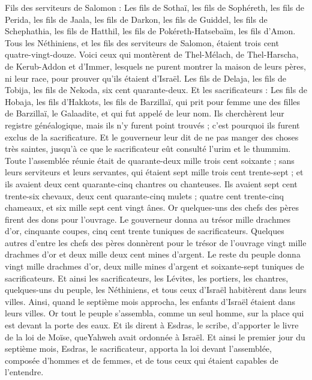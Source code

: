 \begin{multicols}{2}
Fils des serviteurs de Salomon : Les fils de Sothaï, les fils de Sophéreth, les fils de Perida,
les fils de Jaala, les fils de Darkon, les fils de Guiddel,
les fils de Schephathia, les fils de Hatthil, les fils de Pokéreth-Hatsebaïm, les fils d'Amon.
Tous les Néthiniens, et les fils des serviteurs de Salomon, étaient trois cent quatre-vingt-douze.
Voici ceux qui montèrent de Thel-Mélach, de Thel-Harscha, de Kerub-Addon et d'Immer, lesquels ne purent montrer la maison de leurs pères, ni leur race, pour prouver qu’ils étaient d'Israël.
Les fils de Delaja, les fils de Tobija, les fils de Nekoda, six cent quarante-deux.
Et les sacrificateurs : Les fils de Hobaja, les fils d'Hakkots, les fils de Barzillaï, qui prit pour femme une des filles de Barzillaï, le Galaadite, et qui fut appelé de leur nom.
Ils cherchèrent leur registre généalogique, mais ils n'y furent point trouvés ; c'est pourquoi ils furent exclus de la sacrificature.
Et le gouverneur leur dit de ne pas manger des choses très saintes, jusqu'à ce que le sacrificateur eût consulté l'urim et le thummim.
Toute l'assemblée réunie était de quarante-deux mille trois cent soixante ;
sans leurs serviteurs et leurs servantes, qui étaient sept mille trois cent trente-sept ; et ils avaient deux cent quarante-cinq chantres ou chanteuses.
Ils avaient sept cent trente-six chevaux, deux cent quarante-cinq mulets ;
quatre cent trente-cinq chameaux, et six mille sept cent vingt ânes.
Or quelques-uns des chefs des pères firent des dons pour l'ouvrage. Le gouverneur donna au trésor mille drachmes d'or, cinquante coupes, cinq cent trente tuniques de sacrificateurs.
Quelques autres d'entre les chefs des pères donnèrent pour le trésor de l'ouvrage vingt mille drachmes d'or et deux mille deux cent mines d'argent.
Le reste du peuple donna vingt mille drachmes d'or, deux mille mines d'argent et soixante-sept tuniques de sacrificateurs.
Et ainsi les sacrificateurs, les Lévites, les portiers, les chantres, quelques-uns du peuple, les Néthiniens, et tous ceux d'Israël habitèrent dans leurs villes. Ainsi, quand le septième mois approcha, les enfants d'Israël étaient dans leurs villes.
\VerseOne{}Or tout le peuple s'assembla, comme un seul homme, sur la place qui est devant la porte des eaux. Et ils dirent à Esdras, le scribe, d’apporter le livre de la loi de Moïse, queYahweh avait ordonnée à Israël.
Et ainsi le premier jour du septième mois, Esdras, le sacrificateur, apporta la loi devant l'assemblée, composée d'hommes et de femmes, et de tous ceux qui étaient capables de l’entendre.

\end{multicols}
